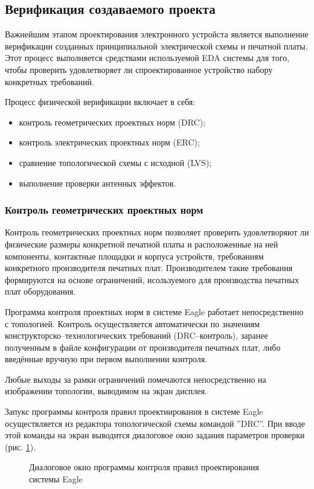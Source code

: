 \subsection{Верификация создаваемого проекта}
Важнейшим этапом проектирования электронного устройста является выполнение
верификации созданных принципиальной электрической схемы и печатной платы.
Этот процесс выполняется средствами используемой EDA системы
для того, чтобы проверить удовлетворяет ли спроектированное устройство набору
конкретных требований.

Процесс физической верификации включает в себя:
\begin{itemize}
	\item{} контроль геометрических проектных норм (DRC);
	\item{} контроль электрических проектных норм (ERC);
	\item{} сравнение топологической схемы с исходной (LVS);
	\item{} выполнение проверки антенных эффектов.
\end{itemize}


\subsubsection{Контроль геометрических проектных норм}
Контроль геометрических проектных норм позволяет проверить удовлетворяют ли физические
размеры конкретной печатной платы и расположенные на ней компоненты, контактные
площадки и корпуса устройств, требованиям конкретного производителя печатных плат.
Производителем такие требования формируются на основе ограничений, исользуемого для
производства печатных плат оборудования.

Программа контроля проектных норм в системе Eagle работает непосредственно с топологией.
Контроль осуществляется автоматически по значениям конструкторско--технологических
требований (DRC--контроль), заранее полученным в файле конфигурации от производителя
печатных плат, либо введённые вручную при первом выполнении контроля.

Любые выходы за рамки ограничений помечаются непосредственно на изображении топологии,
выводимом на экран дисплея.

Запукс программы контроля правил проектиирования в системе Eagle осуществляется из
редактора топологической схемы командой ''DRC''.  При вводе этой команды на экран
выводится диалоговое окно задания параметров проверки (рис. \ref{img:drc}).
\begin{figure}[h]
	\caption{Диалоговое окно программы контроля правил проектирования системы Eagle}
	\label{img:drc}
\end{figure}


